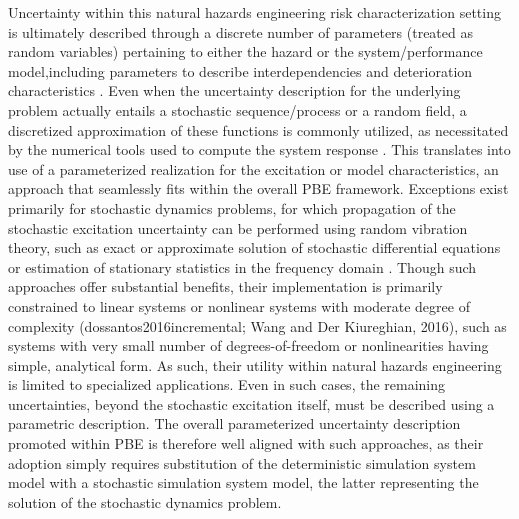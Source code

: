 Uncertainty within this natural hazards engineering risk characterization setting is ultimately described through a discrete number of parameters (treated as random variables) pertaining to either the hazard or the system/performance model,including parameters to describe interdependencies and deterioration characteristics \citep{jia2018statedependent,akiyama2020lifecycle}. Even when the uncertainty description for the underlying problem actually entails a stochastic sequence/process or a random field, a discretized approximation of these functions is commonly utilized, as necessitated by the numerical tools used to compute the system response \citep{gidaris2014surrogate}. This translates into use of a parameterized realization for the excitation or model characteristics, an approach that seamlessly fits within the overall PBE framework. Exceptions exist primarily for stochastic dynamics problems, for which propagation of the stochastic excitation uncertainty can be performed using random vibration theory, such as exact or approximate solution of stochastic differential equations or estimation of stationary statistics in the frequency domain \citep{li2009stochastic}. Though such approaches offer substantial benefits, their implementation is primarily constrained to linear systems or nonlinear systems with moderate degree of complexity (dossantos2016incremental; Wang and Der Kiureghian, 2016), such as systems with very small number of degrees-of-freedom or nonlinearities having simple, analytical form. As such, their utility within natural hazards engineering is limited to specialized applications. Even in such cases, the remaining uncertainties, beyond the stochastic excitation itself, must be described using a parametric description. The overall parameterized uncertainty description promoted within PBE is therefore well aligned with such approaches, as their adoption simply requires substitution of the deterministic simulation system model with a stochastic simulation system model, the latter representing the solution of the stochastic dynamics problem.

